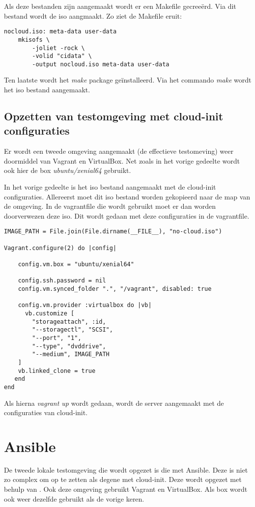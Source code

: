 Als deze bestanden zijn aangemaakt wordt er een Makefile gecreeërd. Via dit bestand wordt de iso aangmaakt. Zo ziet de Makefile eruit:
\begin{lstlisting}
nocloud.iso: meta-data user-data
    mkisofs \
        -joliet -rock \
        -volid "cidata" \
        -output nocloud.iso meta-data user-data
\end{lstlisting}

Ten laatste wordt het \textit{make} package geïnstalleerd. Via het commando \textit{make} wordt het iso bestand aangemaakt.

\subsection{Opzetten van testomgeving met cloud-init configuraties}
Er wordt een tweede omgeving aangemaakt (de effectieve testomeving) weer doormiddel van Vagrant en VirtualBox. Net zoals in het vorige gedeelte wordt ook hier de box \textit{ubuntu/xenial64} gebruikt.

In het vorige gedeelte is het iso bestand aangemaakt met de cloud-init configuraties. Allereerst moet dit iso bestand worden gekopieerd naar de map van de omgeving. In de vagrantfile die wordt gebruikt moet er dan worden doorverwezen deze iso. Dit wordt gedaan met deze configuraties in de vagrantfile.
\begin{lstlisting}
IMAGE_PATH = File.join(File.dirname(__FILE__), "no-cloud.iso")

Vagrant.configure(2) do |config|
	
    config.vm.box = "ubuntu/xenial64"
	
    config.ssh.password = nil	
    config.vm.synced_folder ".", "/vagrant", disabled: true
	
    config.vm.provider :virtualbox do |vb|
	  vb.customize [
	    "storageattach", :id,
	    "--storagectl", "SCSI",
	    "--port", "1",
	    "--type", "dvddrive",
	    "--medium", IMAGE_PATH
	]
	vb.linked_clone = true
   end
end
\end{lstlisting}
Als hierna \textit{vagrant up} wordt gedaan, wordt de server aangemaakt met de configuraties van cloud-init.
 
\section{Ansible}
De tweede lokale testomgeving die wordt opgezet is die met Ansible. Deze is niet zo complex om op te zetten als degene met cloud-init. Deze wordt opgezet met behulp van \autocite{ansibleVagrant}. Ook deze omgeving gebruikt Vagrant en VirtualBox. Als box wordt ook weer dezelfde gebruikt als de vorige keren. 

